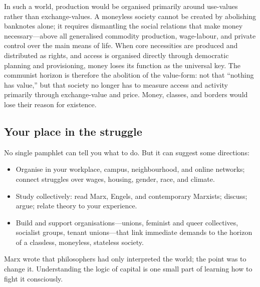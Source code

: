 In such a world, production would be organised primarily around use-values rather
than exchange-values. A moneyless society cannot be created by abolishing banknotes
alone; it requires dismantling the social relations that make money necessary---above
all generalised commodity production, wage-labour, and private control over the main
means of life. When core necessities are produced and distributed as rights, and access
is organised directly through democratic planning and provisioning, money loses its
function as the universal key. The communist horizon is therefore the abolition of the
value-form: not that ``nothing has value,'' but that society no longer has to measure
access and activity primarily through exchange-value and price. Money, classes, and
borders would lose their reason for existence.

\subsection{Your place in the struggle}

No single pamphlet can tell you what to do. But it can suggest some
directions:

\begin{itemize}[leftmargin=1.5em]
  \item Organise in your workplace, campus, neighbourhood, and online
  networks; connect struggles over wages, housing, gender, race, and climate.
  \item Study collectively: read Marx, Engels, and contemporary Marxists;
  discuss; argue; relate theory to your experience.
  \item Build and support organisations---unions, feminist and queer
  collectives, socialist groups, tenant unions---that link immediate demands
  to the horizon of a classless, moneyless, stateless society.
\end{itemize}

Marx wrote that philosophers had only interpreted the world; the point was to
change it.\cite{MarxThesesFeuerbach1845} Understanding the logic of capital is one
small part of learning how to fight it consciously.


\clearpage
\appendix

\setcounter{section}{0}

\renewcommand{\thesection}{\Alph{section}}



\clearpage

\glsfirsttitletrue

